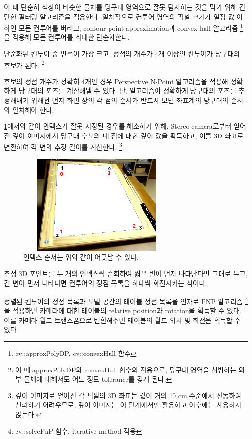 \documentclass[11pt]{oblivoir}
\begin{document}
이 때 단순히 색상이 비슷한 물체를 당구대 영역으로 잘못 탐지하는 것을 막기 위해 간단한 필터링 알고리즘을 적용한다. 일차적으로 컨투어 영역의 픽셀 크기가 일정 값 이하인 모든 컨투어를 버리고, contour point approximation과 convex hull 알고리즘
\footnote{cv::approxPolyDP, cv::convexHull 함수}
을 적용해 모든 컨투어를 최대한 단순화한다.

단순화된 컨투어 중 면적이 가장 크고, 정점의 개수가 4개 이상인 컨투어가 당구대의 후보가 된다.
\footnote{이 때 approxPolyDP와 convexHull 함수의 적용으로, 당구대 영역을 침범하는 외부 물체에 대해서도 어느 정도 tolerance를 갖게 된다.}

후보의 정점 개수가 정확히 4개인 경우 Perspective N-Point 알고리즘을 적용해 정확하게 당구대의 포즈를 계산해낼 수 있다. 단, 알고리즘이 정확하게 당구대의 포즈를 추정해내기 위해선 먼저 화면 상의 각 점의 순서가 반드시 모델 좌표계의 당구대의 순서와 일치해야 한다.

\cref{fig;pool-table-invalid-index}에서와 같이 인덱스가 잘못 지정된 경우를 해소하기 위해, Stereo camera로부터 얻어진 깊이 이미지에서 당구대 후보의 네 점에 대한 깊이 값을 획득하고, 이를 3D 좌표로 변환하여 각 변의 추정 길이를 계산한다.
\footnote{깊이 이미지로 얻어진 각 픽셀의 3D 좌표는 값이 거의 10 cm 수준에서 진동하여 신뢰하기 어려우므로, 깊이 이미지는 이 단계에서만 활용하고 이후에는 사용하지 않는다.}

\begin{figure}[ht]
        \begin{center}
                \includegraphics[width=8cm, height=5cm, keepaspectratio]{img/billiards-table-indexes.png}
        \end{center}
        \caption{인덱스 순서는 위와 같이 어긋날 수 있다.}
        \label{fig;pool-table-invalid-index}
\end{figure}

추정 3D 포인트를 두 개의 인덱스씩 순회하여 짧은 변이 먼저 나타난다면 그대로 두고, 긴 변이 먼저 나타나면 컨투어의 정점 목록을 하나씩 회전시키는 식이다.

정렬된 컨투어의 정점 목록과 모델 공간의 테이블 정점 목록을 인자로 PNP 알고리즘
\footnote{cv::solvePnP 함수, iterative method 적용}
을 적용하면 카메라에 대한 테이블의 relative position과 rotation을 획득할 수 있다. 이를 카메라 월드 트랜스폼으로 변환해주면 테이블의 월드 위치 및 회전을 획득할 수 있다.
\end{document}
